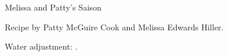 \begin{recipe}{Melissa and Patty's Saison} %

\begin{aboutblock}
Recipe by Patty McGuire Cook and Melissa Edwards Hiller.
\end{aboutblock}


\begin{methodandtiming}

\begin{mashsteps}
\end{mashsteps}

\begin{fermentationsteps}
\end{fermentationsteps}

\begin{directions}
Water adjustment: .
\end{directions}

\end{methodandtiming}

\recipebreak

\begin{ingredientsblock}

\begin{malts}
\end{malts}

\begin{hops}
\end{hops}


\end{ingredientsblock}

\end{recipe}

